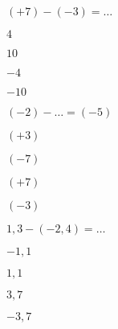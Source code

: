 \begin{QCM}
\begin{GroupeQCM}
    \begin{exercice}
      $(+7) - (-3) = \ldots$
      \begin{ChoixQCM}{4}
      \item $4$
      \item $10$
      \item $-4$
      \item $-10$
      \end{ChoixQCM}
\begin{corrige}
   \end{corrige}
    \end{exercice}


    \begin{exercice}
      $(-2) - \ldots = (-5)$
      \begin{ChoixQCM}{4}
      \item $(+3)$
      \item $(-7)$
      \item $(+7)$
      \item $(-3)$
      \end{ChoixQCM}
\begin{corrige}
   \end{corrige}
    \end{exercice}


    \begin{exercice}
      $1,3 - (-2,4) = \ldots$
      \begin{ChoixQCM}{4}
      \item $-1,1$
      \item $1,1$
      \item $3,7$
      \item $-3,7$
      \end{ChoixQCM}
\begin{corrige}
   \end{corrige}
    \end{exercice}


\end{GroupeQCM}
\end{QCM}

  